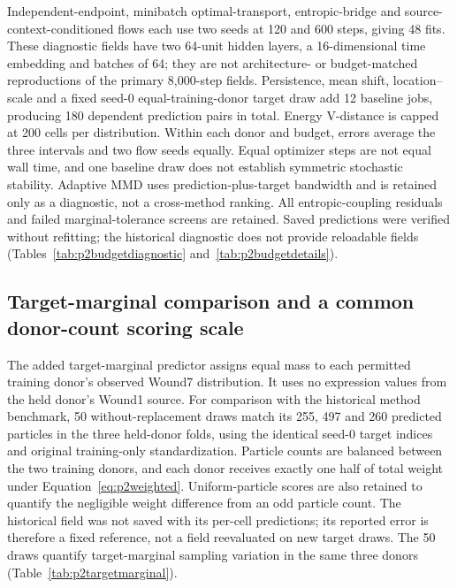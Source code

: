 Independent-endpoint, minibatch optimal-transport, entropic-bridge and source-context-conditioned flows each use two seeds at 120 and 600 steps, giving 48 fits. These diagnostic fields have two 64-unit hidden layers, a 16-dimensional time embedding and batches of 64; they are not architecture- or budget-matched reproductions of the primary 8,000-step fields. Persistence, mean shift, location--scale and a fixed seed-0 equal-training-donor target draw add 12 baseline jobs, producing 180 dependent prediction pairs in total. Energy V-distance is capped at 200 cells per distribution. Within each donor and budget, errors average the three intervals and two flow seeds equally. Equal optimizer steps are not equal wall time, and one baseline draw does not establish symmetric stochastic stability. Adaptive MMD uses prediction-plus-target bandwidth and is retained only as a diagnostic, not a cross-method ranking. All entropic-coupling residuals and failed marginal-tolerance screens are retained. Saved predictions were verified without refitting; the historical diagnostic does not provide reloadable fields (Tables~\ref{tab:p2budgetdiagnostic} and~\ref{tab:p2budgetdetails}).

\subsection{Target-marginal comparison and a common donor-count scoring scale}
The added target-marginal predictor assigns equal mass to each permitted training donor's observed Wound7 distribution. It uses no expression values from the held donor's Wound1 source. For comparison with the historical method benchmark, 50 without-replacement draws match its 255, 497 and 260 predicted particles in the three held-donor folds, using the identical seed-0 target indices and original training-only standardization. Particle counts are balanced between the two training donors, and each donor receives exactly one half of total weight under Equation~\eqref{eq:p2weighted}. Uniform-particle scores are also retained to quantify the negligible weight difference from an odd particle count. The historical field was not saved with its per-cell predictions; its reported error is therefore a fixed reference, not a field reevaluated on new target draws. The 50 draws quantify target-marginal sampling variation in the same three donors (Table~\ref{tab:p2targetmarginal}).

